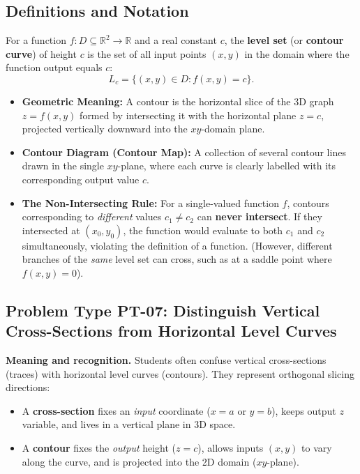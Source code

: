 \documentclass[11pt,letterpaper]{article}
\newcommand{\R}{\mathbb{R}}
\begin{document}
\subsection{Definitions and Notation}
For a function $f: D \subseteq \R^2 \to \R$ and a real constant $c$, the \textbf{level set} (or \textbf{contour curve}) of height $c$ is the set of all input points $(x,y)$ in the domain where the function output equals $c$:
\[ L_c = \{(x,y) \in D : f(x,y) = c\}. \]
\begin{itemize}[leftmargin=*]
    \item \textbf{Geometric Meaning:} A contour is the horizontal slice of the 3D graph $z = f(x,y)$ formed by intersecting it with the horizontal plane $z = c$, projected vertically downward into the $xy$-domain plane.
    \item \textbf{Contour Diagram (Contour Map):} A collection of several contour lines drawn in the single $xy$-plane, where each curve is clearly labelled with its corresponding output value $c$.
    \item \textbf{The Non-Intersecting Rule:} For a single-valued function $f$, contours corresponding to \emph{different} values $c_1 \ne c_2$ can \textbf{never intersect}. If they intersected at $(x_0,y_0)$, the function would evaluate to both $c_1$ and $c_2$ simultaneously, violating the definition of a function. (However, different branches of the \emph{same} level set can cross, such as at a saddle point where $f(x,y)=0$).
\end{itemize}

\subsection{Problem Type PT-07: Distinguish Vertical Cross-Sections from Horizontal Level Curves}\label{pt:07}

\textbf{Meaning and recognition.} 
Students often confuse vertical cross-sections (traces) with horizontal level curves (contours). They represent orthogonal slicing directions:
\begin{itemize}[leftmargin=*,nosep]
    \item A \textbf{cross-section} fixes an \emph{input} coordinate ($x=a$ or $y=b$), keeps output $z$ variable, and lives in a vertical plane in 3D space.
    \item A \textbf{contour} fixes the \emph{output} height ($z=c$), allows inputs $(x,y)$ to vary along the curve, and is projected into the 2D domain ($xy$-plane).
\end{itemize}
\end{document}
